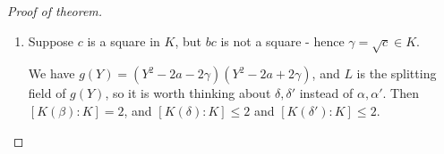 \documentclass{article}
\theoremstyle{definition}
\theoremstyle{plain}%
\theoremstyle{remark}
\begin{document}
\begin{proof}[Proof of theorem]
\begin{enumerate}
        Now we have the degree of $[L : K] = 4$, as $[L : K(\beta)] = 2$ and $[K(\beta) : K] =2$. Now we need to show that $G = C_4$.
        
        Take $\sigma \in G$. Then we have that same cases as before:
        \begin{itemize}
            \item $\sigma(\beta) = \pm \beta$
            \item If $\sigma(\beta) = \beta$ then $\sigma(\alpha) = \pm\alpha$ and $\sigma(\alpha') = \pm \alpha'$
            \item If $\sigma(\beta) = -\beta$ then $\sigma(\alpha) = \pm \alpha'$ and $\sigma(\alpha') = \pm \alpha$
        \end{itemize}
        
        But we can't have all 8 cases as before since $|G| = [L : K] = 4$, so what has changed?
        
        We know that $\alpha \alpha' = \gamma$, and $\beta \gamma \in K$, hence $\beta \gamma$ is fixed, so if $\sigma(\beta) = \beta$ then $\sigma (\gamma)$ depends on $\beta$. $\gamma'$ also depends on $\beta$. So actually $\sigma(\alpha)$ depends on where $\beta$ gets sent, and can only differ by where $\sigma(\alpha')$ gets sent (since $\alpha \alpha' = \gamma$), hence we can only have $2^2 = 4$ different $\sigma$.
        
        We also can choose $\sigma(\beta) = -\beta$ as the generator: it generates all $\sigma \in G$, hence $G = C_4$.
        

        
        \item Suppose $c$ is a square in $K$, but $bc$ is not a square - hence $\gamma = \sqrt{c} \in K$.
        
        We have $g(Y) = (Y^2 -2a -2\gamma)(Y^2 - 2a + 2\gamma)$, and $L$ is the splitting field of $g(Y)$, so it is worth thinking about $\delta, \delta'$ instead of $\alpha, \alpha'$. Then $[K(\beta) : K] = 2$, and $[K(\delta) : K] \le 2$ and $[K(\delta') : K] \le 2$.
        \begin{figure}[h]
            \centering
        \end{figure}
        

\end{enumerate}
\end{proof}
\end{document}
